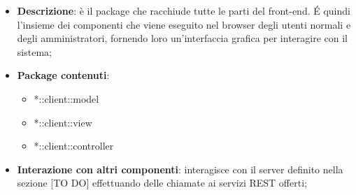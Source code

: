 	\begin{itemize}
		\item \textbf{Descrizione}: è il package che racchiude tutte le parti del front-end. \'E quindi l'insieme dei componenti che viene eseguito nel browser degli utenti normali e degli amministratori, fornendo loro un'interfaccia grafica per interagire con il sistema;
		\item \textbf{Package contenuti}:
			\begin{itemize}
				\item *::client::model
				\item *::client::view
				\item *::client::controller
			\end{itemize}
		\item \textbf{Interazione con altri componenti}: interagisce con il server definito nella sezione [TO DO] effettuando delle chiamate ai servizi REST offerti;
	\end{itemize}

	\pagebreak
	 \clearpage \newpage

	 \clearpage \newpage

	 \clearpage \newpage




